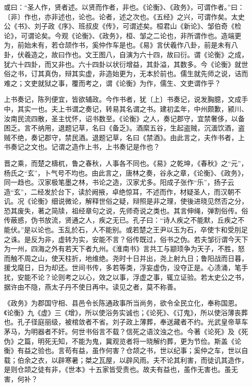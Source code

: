 \documentclass[]{article}
\begin{document}
或曰：``圣人作，贤者述。以贤而作者，非也。《论衡》、《政务》，可谓作者。''曰：〔非〕作也，亦非述也，论也。论者，述之次也。《五经》之兴，可谓作矣。太史公《书》、刘子政《序》、班叔皮《传》，可谓述矣。桓君山《新论》、邹伯奇《检论》，可谓论矣。今观《论衡》、《政务》，桓、邹之二论也，非所谓作也。造端更为，前始未有，若仓颉作书，奚仲作车是也。《易》言伏羲作八卦，前是未有八卦，伏羲造之，故曰作也。文王图八，自演为六十四，故曰衍。谓《论衡》之成，犹六十四卦，而又非也。六十四卦以状衍增益，其卦溢，其数多。今《论衡》就世俗之书，订其真伪，辩其实虚，非造始更为，无本於前也。儒生就先师之说，诘而难之；文吏就狱之事，覆而考之，谓《论衡》为作，儒生、文吏谓作乎？

上书奏记，陈列便宜，皆欲辅政。今作书者，犹〔上〕书奏记，说发胸臆，文成手中，其实一也。夫上书谓之奏记，转易其名谓之书。建初孟年，中州颇歉，颍川、汝南民流四散，圣主忧怀，诏书数至。《论衡》之人，奏记郡守，宜禁奢侈，以备困乏。言不纳用，退题记草，名曰《备乏》。酒縻五谷，生起盗贼，沉湎饮酒，盗贼不绝，奏记郡守，禁民酒。退题记草，名曰《禁酒》。由此言之，夫作书者，上书奏记之文也。记谓之造作上书，上书奏记是作也？

晋之乘，而楚之檮杌，鲁之春秋，人事各不同也。《易》之乾坤，《春秋》之``元''，杨氏之``玄''，卜气号不均也。由此言之，唐林之奏，谷永之章，《论衡》、《政务》，同一趋也。汉家极笔墨之林，书论之造，汉家尤多。阳成子张作``乐''，扬子云造``玄''，二经发於台下，读於阙掖，卓绝惊耳，不述而作，材疑圣人，而汉朝不讥。况《论衡》细说微论，解释世俗之疑，辩照是非之理，使後进晓见然否之分，恐其废失，著之简牍，祖经章句之说，先师奇说之类也。其言伸绳，弹割俗传。俗传蔽惑，伪书放流，贤通之人，疾之无已。孔子曰：``诗人疾之不能默，丘疾之不能伏。''是以论也。玉乱於石，人不能别。或若楚之王尹以玉为石，卒使卞和受刖足之诛。是反为非，虚转为实，安能不言？俗传既过，俗书之伪。若夫邹衍谓今天下为一州，四海之外有若天下者九州。《淮南书》言共工与颛顼争为天子，不胜，怒而触不周之山，使天柱折，地维绝。尧时十日并出，尧上射九日；鲁阳战而日暮，援戈麾日，日为却还。世间书传，多若等类，浮妄虚伪，没夺正是。心渍涌，笔手扰，安能不论？论则考之以心，效之以事，浮虚之事，辄立证验。若太史公之书，据许由不隐，燕太子丹不使日再中。读见之者，莫不称善。

《政务》为郡国守相、县邑令长陈通政事所当尚务，欲令全民立化，奉称国恩。《论衡》九《虚》三《增》，所以使浴务实诚也；《论死》、《订鬼》，所以使浴薄丧葬也。孔子径庭丽级，被棺敛者不省。刘子政上薄葬，奉送藏者不约。光武皇帝草车茅马，为明器者不奸。何世书俗言不载？信死之语汶浊之也。今著《论死》及《死伪》之篇，明死无知，不能为鬼，冀观览者将一晓解约葬，更为节俭。斯盖《论衡》有益之验也。言苟有益，虽作何害？仓颉之书，世以纪事；奚仲之车，世以自载；伯余之衣，以辟寒暑；桀之瓦屋，以辟风雨。夫不论其利害，而徒讥其造作，是则仓颉之徒有非，《世本》十五家皆受责也。故夫有益也，虽作无害也。虽无害，何补？
\end{document}

